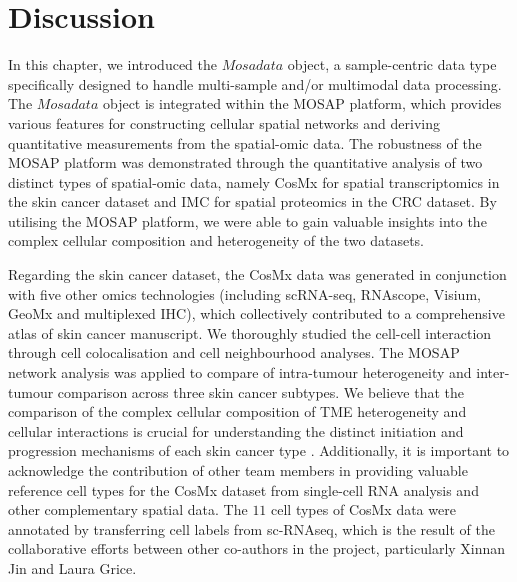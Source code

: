 \section{Discussion}
In this chapter, we introduced the $Mosadata$ object, a sample-centric data type specifically designed to handle multi-sample and/or multimodal data processing. The $Mosadata$ object is integrated within the MOSAP platform, which provides various features for constructing cellular spatial networks and deriving quantitative measurements from the spatial-omic data. The robustness of the MOSAP platform was demonstrated through the quantitative analysis of two distinct types of spatial-omic data, namely CosMx for spatial transcriptomics in the skin cancer dataset and IMC for spatial proteomics in the CRC dataset. By utilising the MOSAP platform, we were able to gain valuable insights into the complex cellular composition and heterogeneity of the two datasets. 

Regarding the skin cancer dataset, the CosMx data was generated in conjunction with five other omics technologies (including scRNA-seq, RNAscope, Visium, GeoMx and multiplexed IHC), which collectively contributed to a comprehensive atlas of skin cancer manuscript. We thoroughly studied the cell-cell interaction through cell colocalisation and cell neighbourhood analyses. The MOSAP network analysis was applied to compare of intra-tumour heterogeneity and inter-tumour comparison across three skin cancer subtypes. We believe that the comparison of the complex cellular composition of TME heterogeneity and cellular interactions is crucial for understanding the distinct initiation and progression mechanisms of each skin cancer type \cite{stonesifer2021immune,wang2016crosstalk}. Additionally, it is important to acknowledge the contribution of other team members in providing valuable reference cell types for the CosMx dataset from single-cell RNA analysis and other complementary spatial data. The $11$ cell types of CosMx data were annotated by transferring cell labels from sc-RNAseq, which is the result of the collaborative efforts between other co-authors in the project, particularly Xinnan Jin and Laura Grice.        

